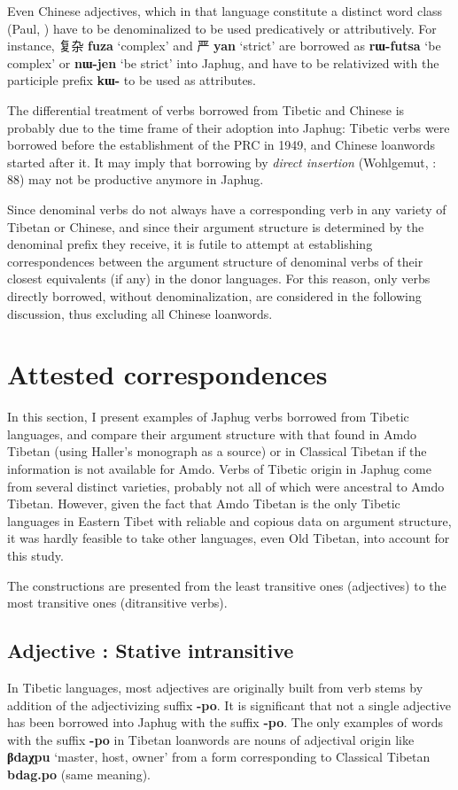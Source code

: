 \documentclass[oneside,a4paper,11pt]{article}
\newcommand{\ipa}[1]{{\phon\textbf{\mbox{#1}}}} %
\newcommand{\zh}[1]{{\cn #1}}
\begin{document}
Even Chinese adjectives, which in that language constitute a distinct word class (Paul, \citeyear{paul10adj}) have to be denominalized to be used predicatively or attributively. For instance, \zh{复杂} \ipa{fuza} `complex' and \zh{严} \ipa{yan} `strict' are borrowed as \ipa{rɯ-futsa} `be complex' or \ipa{nɯ-jen} `be strict' into Japhug, and have to be relativized with the participle prefix \ipa{kɯ-} to be used as attributes.

The differential treatment of verbs borrowed from Tibetic and Chinese is probably due to the time frame of their adoption into Japhug: Tibetic verbs were borrowed before the establishment of the PRC in 1949, and Chinese loanwords started after it. It may imply that borrowing by \textit{direct insertion} (Wohlgemut, \citeyear{wohlgemuth09verbal}: 88) may not be productive anymore in Japhug.

Since denominal verbs do not always have a corresponding verb in any variety of Tibetan or Chinese, and since their argument structure is determined by the denominal prefix they receive, it is futile to attempt at establishing correspondences between the argument structure of denominal verbs of their closest equivalents (if any) in the donor languages. For this reason, only verbs directly borrowed, without denominalization, are considered in the following discussion, thus excluding all Chinese loanwords.
 
  \section{Attested correspondences} 
 In this section, I present examples of Japhug verbs borrowed from Tibetic languages, and compare their argument structure with that found in Amdo Tibetan (using Haller's \citeyear{haller04themchen} monograph as a source) or in Classical Tibetan if the information is not available for Amdo. Verbs of Tibetic origin in Japhug come from several distinct varieties, probably not all of which were ancestral to Amdo Tibetan. However, given the fact that Amdo Tibetan is the only Tibetic languages in Eastern Tibet with reliable and copious data on argument structure, it was hardly feasible to take other languages, even Old Tibetan, into account for this study.
 
 The constructions are presented from the least transitive ones (adjectives) to the most transitive ones (ditransitive verbs). 
   
  \subsection{Adjective : Stative intransitive}  
In Tibetic languages, most adjectives are originally built from verb stems by addition of the adjectivizing suffix \ipa{-po}. It is significant that not a single adjective has been borrowed into Japhug with the suffix \ipa{-po}. The only examples of words with the suffix \ipa{-po} in Tibetan loanwords are nouns of adjectival origin like \ipa{βdaχpu} `master, host, owner' from a form corresponding to Classical Tibetan \ipa{bdag.po} (same meaning).
\end{document}
